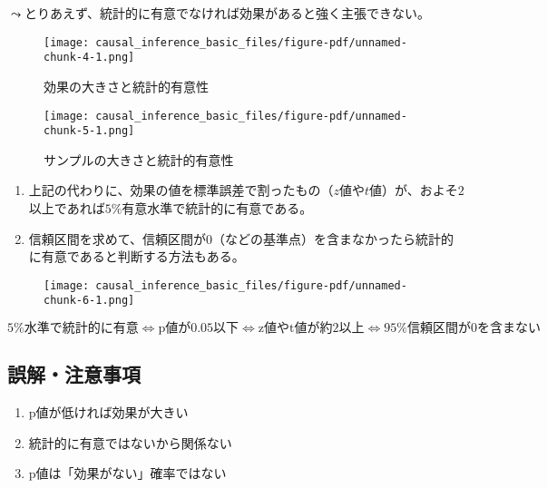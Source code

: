 \documentclass[
  xelatex,
  ja=standard]{bxjsarticle}
\providecommand{\tightlist}{%
  \setlength{\itemsep}{0pt}\setlength{\parskip}{0pt}}\usepackage{longtable,booktabs,array}
\begin{document}
\(\leadsto\)とりあえず、統計的に有意でなければ効果があると強く主張できない。

\begin{figure}[htpb]

{\centering \texttt{[image: causal\_inference\_basic\_files/figure-pdf/unnamed-chunk-4-1.png]}

}

\caption{効果の大きさと統計的有意性}

\end{figure}

\begin{figure}[htpb]

{\centering \texttt{[image: causal\_inference\_basic\_files/figure-pdf/unnamed-chunk-5-1.png]}

}

\caption{サンプルの大きさと統計的有意性}

\end{figure}

\begin{enumerate}
\def\labelenumi{\arabic{enumi}.}
\tightlist
\item
  上記の代わりに、効果の値を標準誤差で割ったもの（\(z\)値や\(t\)値）が、およそ\(2\)以上であれば\(5\%\)有意水準で統計的に有意である。
\item
  信頼区間を求めて、信頼区間が0（などの基準点）を含まなかったら統計的に有意であると判断する方法もある。
\end{enumerate}

\begin{figure}[htpb]

{\centering \texttt{[image: causal\_inference\_basic\_files/figure-pdf/unnamed-chunk-6-1.png]}

}

\end{figure}

\(\textrm{5\%水準で統計的に有意} \Leftrightarrow \textrm{p値が0.05以下} \Leftrightarrow \textrm{z値やt値が約2以上} \Leftrightarrow \textrm{95\%信頼区間が0を含まない}\)

\hypertarget{ux8aa4ux89e3ux6ce8ux610fux4e8bux9805}{%
\subsection{誤解・注意事項}\label{ux8aa4ux89e3ux6ce8ux610fux4e8bux9805}}

\begin{enumerate}
\def\labelenumi{\arabic{enumi}.}
\tightlist
\item
  p値が低ければ効果が大きい
\item
  統計的に有意ではないから関係ない
\item
  p値は「効果がない」確率ではない
\end{enumerate}
\end{document}
